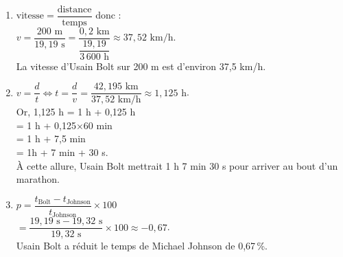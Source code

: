 \ \\ [-5mm]
   \begin{enumerate}
      \item $\text{vitesse} =\dfrac{\text{distance}}{\text{temps}}$ donc : \\ [1mm]
         $v =\dfrac{200\text{ m}}{19,19\text{ s}} =\dfrac{0,2\text{ km}}{\dfrac{19,19}{3\,600\text{ h}}} \approx37,52\text{ km/h}.$ \\ [1mm]
        {\blue La vitesse d'Usain Bolt sur 200 m est d'environ 37,5 km/h.} \\ [1mm]
      \item $v =\dfrac{d}{t} \iff t =\dfrac{d}{v} =\dfrac{42,195\text{ km}}{37,52\text{ km/h}} \approx1,125\text{ h}$. \\ [1mm]
         Or, 1,125 h = 1 h + 0,125 h \\
         \hspace*{1.54cm} = 1 h + 0,125$\times$60 min \\
         \hspace*{1.54cm} = 1 h + 7,5 min \\
         \hspace*{1.54cm} = 1h + 7 min + 30 s. \\
         {\blue À cette allure, Usain Bolt mettrait 1 h 7 min 30 s pour arriver au bout d'un marathon.} \\ [1mm]
      \item $p =\dfrac{t_{\text{Bolt}}-t_{\text{Johnson}}}{t_{\text{Johnson}}}\times100$ \\ [1mm]
          \hspace*{6.5mm} $=\dfrac{19,19\text{ s}-19,32\text{ s}}{19,32\text{ s}}\times100 \approx-0,67$. \\ [1mm]
         {\blue Usain Bolt a réduit le temps de Michael Johnson de 0,67\,\%.}
   \end{enumerate}
